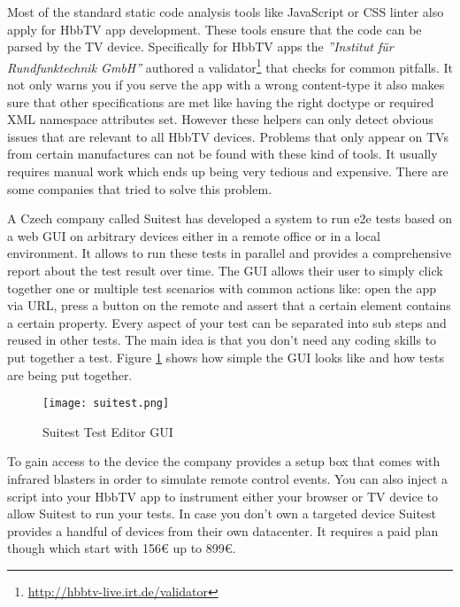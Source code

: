 Most of the standard static code analysis tools like JavaScript or CSS linter also apply for HbbTV app
development. These tools ensure that the code can be parsed by the TV device. Specifically for
HbbTV apps the \textit{''Institut für Rundfunktechnik GmbH''} authored a validator\footnote{\url{http://hbbtv-live.irt.de/validator}} that checks
for common pitfalls. It not only warns you if you serve the app with a wrong content-type
it also makes sure that other specifications are met like having the right doctype or required
XML namespace attributes set. However these helpers can only detect obvious issues that are relevant
to all HbbTV devices. Problems that only appear on TVs from certain manufactures can not be found
with these kind of tools. It usually requires manual work which ends up being very tedious and
expensive. There are some companies that tried to solve this problem.

A Czech company called Suitest has developed a system to run e2e tests based on a web GUI on
arbitrary devices either in a remote office or in a local environment. It allows to run these
tests in parallel and provides a comprehensive report about the test result over time. The
GUI allows their user to simply click together one or multiple test scenarios with common
actions like: open the app via URL, press a button on the remote and assert that a certain element
contains a certain property. Every aspect of your test can be separated into sub steps and
reused in other tests. The main idea is that you don't need any coding skills to put together
a test. Figure \ref{fig:suitest} shows how simple the GUI looks like and how tests are being put
together.

\begin{figure}[htb]
  \centering
  \texttt{[image: suitest.png]}\\
  \caption{Suitest Test Editor GUI}\label{fig:suitest}
\end{figure}

To gain access to the device the company provides a setup box that comes with infrared blasters
in order to simulate remote control events. You can also inject a script into your HbbTV app
to instrument either your browser or TV device to allow Suitest to run your tests. In case
you don't own a targeted device Suitest provides a handful of devices from their own datacenter.
It requires a paid plan though which start with 156\euro{} up to 899\euro{}.

